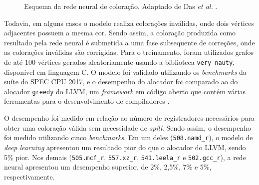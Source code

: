 \documentclass[
	12pt,				%
	openright,			%
	oneside,			%
	a4paper,			%
	tccpreliminar,			%
	]{ABNT-DC-UEL}
\begin{document}
\begin{figure}[hbt]
{
    }
    \caption{Esquema da rede neural de coloração. Adaptado de Das \textit{et al.} \cite{das:20}.}
    \label{fig:das-modelo}
\end{figure}

Todavia, em alguns casos o modelo realiza colorações inválidas, onde dois vértices adjacentes possuem a mesma cor. Sendo assim, a coloração produzida como resultado pela rede neural é submetida a uma fase subsequente de correções, onde as colorações inválidas são corrigidas. Para o treinamento, foram utilizados grafos de até 100 vértices gerados aleatoriamente usando a biblioteca \texttt{very nauty}, disponível em linguagem C. O modelo foi validado utilizando os \textit{benchmarks} da suíte do SPEC CPU 2017, e o desempenho do alocador foi comparado ao do alocador \texttt{greedy} do LLVM, um \textit{framework} em código aberto que contém várias ferramentas para o desenvolvimento de compiladores 
\cite{lattner:04}. 

O desempenho foi medido em relação ao número de registradores necessários para obter uma coloração válida sem necessidade de \textit{spill}. Sendo assim, o desempenho foi medido utilizando cinco \textit{benchmarks}. Em um deles (\texttt{508.namd\_r}), o modelo de \textit{deep learning} apresentou um resultado pior do que o alocador do LLVM, sendo 5\% pior. Nos demais (\texttt{505.mcf\_r}, \texttt{557.xz\_r}, \texttt{541.leela\_r} e \texttt{502.gcc\_r}), a rede neural apresentou um desempenho superior, de 2\%, 2,5\%, 7\% e 5\%, respectivamente.
\end{document}
